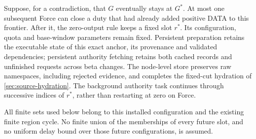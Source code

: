 Suppose, for a contradiction, that $G$ eventually stays at $G^*$.
At most one subsequent Force can close a duty that had already added
positive DATA to this frontier. After it, the zero-output rule keeps a
fixed slot $r^*$. Its configuration, quota and base-window parameters
remain fixed. Persistent preparation retains the executable state of
this exact anchor, its provenance and validated dependencies; persistent
authority fetching retains both cached records and unfinished requests
across beta changes. The node-level store preserves raw namespaces,
including rejected evidence, and completes the fixed-cut hydration of
\cref{sec:source-hydration}. The background authority task continues through
successive indices of $r^*$, rather than restarting at zero on Force.

All finite sets used below belong to this installed configuration and
the existing finite region cycle. No finite union of the memberships
of every future slot, and no uniform delay bound over those future
configurations, is assumed.

